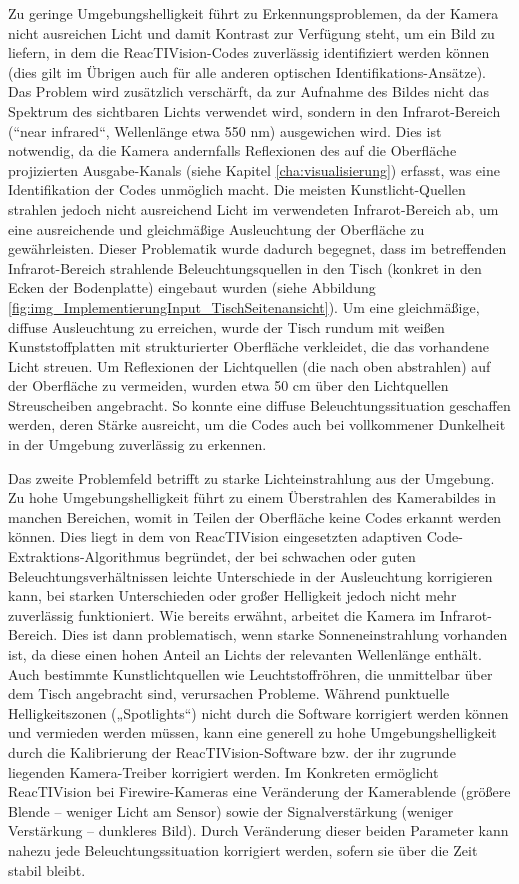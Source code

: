Zu geringe Umgebungshelligkeit führt zu Erkennungsproblemen, da der Kamera nicht ausreichen Licht und damit Kontrast zur Verfügung steht, um ein Bild zu liefern, in dem die ReacTIVision-Codes zuverlässig identifiziert werden können (dies gilt im Übrigen auch für alle anderen optischen Identifikations-Ansätze). Das Problem wird zusätzlich verschärft, da zur Aufnahme des Bildes nicht das Spektrum des sichtbaren Lichts verwendet wird, sondern in den Infrarot-Bereich (“near infrared“, Wellenlänge etwa 550 nm) ausgewichen wird. Dies ist notwendig, da die Kamera andernfalls Reflexionen des auf die Oberfläche projizierten Ausgabe-Kanals (siehe Kapitel \ref{cha:visualisierung}) erfasst, was eine Identifikation der Codes unmöglich macht. Die meisten Kunstlicht-Quellen strahlen jedoch nicht ausreichend Licht im verwendeten Infrarot-Bereich ab, um eine ausreichende und gleichmäßige Ausleuchtung der Oberfläche zu gewährleisten. Dieser Problematik wurde dadurch begegnet, dass im betreffenden Infrarot-Bereich strahlende Beleuchtungsquellen in den Tisch (konkret in den Ecken der Bodenplatte) eingebaut wurden (siehe Abbildung \ref{fig:img_ImplementierungInput_TischSeitenansicht}). Um eine gleichmäßige, diffuse Ausleuchtung zu erreichen, wurde der Tisch rundum mit weißen Kunststoffplatten mit strukturierter Oberfläche verkleidet, die das vorhandene Licht streuen. Um Reflexionen der Lichtquellen (die nach oben abstrahlen) auf der Oberfläche zu vermeiden, wurden etwa 50 cm über den Lichtquellen Streuscheiben angebracht. So konnte eine diffuse Beleuchtungssituation geschaffen werden, deren Stärke ausreicht, um die Codes auch bei vollkommener Dunkelheit in der Umgebung zuverlässig zu erkennen.

Das zweite Problemfeld betrifft zu starke Lichteinstrahlung aus der Umgebung. Zu hohe Umgebungshelligkeit führt zu einem Überstrahlen des Kamerabildes in manchen Bereichen, womit in Teilen der Oberfläche keine Codes erkannt werden können. Dies liegt in dem von ReacTIVision eingesetzten adaptiven Code-Extraktions-Algorithmus begründet, der bei schwachen oder guten Beleuchtungsverhältnissen leichte Unterschiede in der Ausleuchtung korrigieren kann, bei starken Unterschieden oder großer Helligkeit jedoch nicht mehr zuverlässig funktioniert. Wie bereits erwähnt, arbeitet die Kamera im Infrarot-Bereich. Dies ist dann problematisch, wenn starke Sonneneinstrahlung vorhanden ist, da diese einen hohen Anteil an Lichts der relevanten Wellenlänge enthält. Auch bestimmte Kunstlichtquellen wie Leuchtstoffröhren, die unmittelbar über dem Tisch angebracht sind, verursachen Probleme. Während punktuelle Helligkeitszonen („Spotlights“) nicht durch die Software korrigiert werden können und vermieden werden müssen, kann eine generell zu hohe Umgebungshelligkeit durch die Kalibrierung der ReacTIVision-Software bzw. der ihr zugrunde liegenden Kamera-Treiber korrigiert werden. Im Konkreten ermöglicht ReacTIVision bei Firewire-Kameras eine Veränderung der Kamerablende (größere Blende -- weniger Licht am Sensor) sowie der Signalverstärkung (weniger Verstärkung -- dunkleres Bild). Durch Veränderung dieser beiden Parameter kann nahezu jede Beleuchtungssituation korrigiert werden, sofern sie über die Zeit stabil bleibt.

